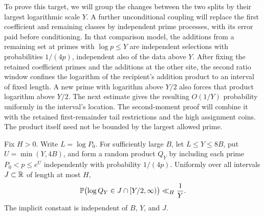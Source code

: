 To prove this target, we will group the changes between the two splits
by their largest logarithmic scale $Y$. A further unconditional coupling
will replace the first coefficient and remaining classes by independent
prime processes, with its error paid before conditioning. In that
comparison model, the additions from a remaining set at primes with
$\log p\le Y$ are independent selections with probabilities $1/(4p)$,
independent also of the data above $Y$. After fixing the retained
coefficient primes and the additions at the other site, the second ratio
window confines the logarithm of the recipient's addition product to an
interval of fixed length. A new prime with logarithm above $Y/2$ also
forces that product logarithm above $Y/2$. The next estimate
gives the resulting $O(1/Y)$ probability uniformly in the interval's
location. The second-moment proof will combine it with the retained
first-remainder tail restrictions and the high assignment coins.
The product itself need not be bounded by the largest allowed prime.

\begin{lemma}\label{lem:amp-small-ball}
Fix $H>0$.  Write $L=\log P_0$.  For sufficiently large $B$, let
$L\le Y\le8B$, put $U=\min(Y,4B)$, and form a random product $Q_Y$ by
including each prime $P_0<p\le e^U$ independently with probability
$1/(4p)$.  Uniformly over all intervals $J\subset\mathbb R$ of length at
most $H$,
\[
 \mathbb P\bigl(\log Q_Y\in J\cap[Y/2,\infty)\bigr)
 \ll_H\frac1Y.
\]
The implicit constant is independent of $B$, $Y$, and $J$.
\end{lemma}

